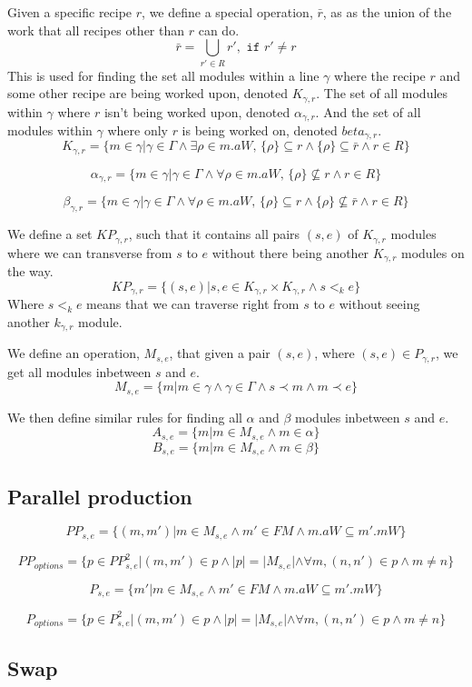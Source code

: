 Given a specific recipe $r$, we define a special operation, $\bar{r}$, as as the union of the work that all recipes other than $r$ can do. 
\[\bar{r} = \bigcup_{r' \in R}r', \texttt{ if } r' \neq r\]
This is used for finding the set all modules within a line $\gamma$ where the recipe $r$ and some other recipe are being worked upon, denoted $K_{\gamma ,r}$. The set of all modules within $\gamma$ where $r$ isn't being worked upon, denoted $\alpha_{\gamma ,r}$. And the set of all modules within $\gamma$ where only $r$ is being worked on, denoted $beta_{\gamma ,r}$. 
\[K_{\gamma ,r} = \{m \in \gamma | \gamma \in \Gamma \land \exists \rho \in m.aW,\, \{\rho\} \subseteq r \land \{\rho\} \subseteq \bar{r} \land r \in R\}\]

\[\alpha_{\gamma ,r}  = \{m \in \gamma | \gamma \in \Gamma \land \forall \rho \in m.aW,\, \{\rho\} \nsubseteq r \land r \in R\}\]

\[\beta_{\gamma ,r}  = \{m \in \gamma | \gamma \in \Gamma \land \forall \rho \in m.aW,\, \{\rho\} \subseteq r \land \{\rho\} \nsubseteq \bar{r} \land r \in R\}\]


We define a set $KP_{\gamma ,r}$, such that it contains all pairs $(s, e)$ of $K_{\gamma ,r}$ modules where we can transverse from $s$ to $e$ without there being another $K_{\gamma, r}$ modules on the way.
\[KP_{\gamma ,r} = \{(s, e)| {s, e} \in K_{\gamma ,r} \times K_{\gamma ,r} \land s <_k  e\}\]
Where $s <_k e$ means that we can traverse right from $s$ to $e$ without seeing another $k_{\gamma, r}$ module. 

We define an operation, $M_{s,e}$, that given a pair $(s, e)$, where $(s, e) \in P_{\gamma ,r}$, we get all modules inbetween $s$ and $e$.
\[M_{s,e} = \{m | m \in \gamma \land \gamma \in \Gamma \land s \prec m \land m \prec e\}\]

We then define similar rules for finding all $\alpha$ and $\beta$ modules inbetween $s$ and $e$.
\[A_{s,e} = \{m |m \in M_{s,e} \land m \in \alpha\}\]
\[B_{s,e} = \{m |m \in M_{s,e} \land m \in \beta\}\]

\subsection{Parallel production}

\[PP_{s, e} = \{(m, m')| m \in M_{s,e} \land m' \in FM \land m.aW \subseteq m'.mW\} \]

\[ PP_{options} = \{p \in {PP}_{s,e}^2 | (m,m') \in p \land |p| = |M_{s,e}| \land  \forall m , (n,n') \in p \land m \neq n \} \]


\[P_{s, e} = \{m'| m \in M_{s,e} \land m' \in FM \land m.aW \subseteq m'.mW\} \]

\[ P_{options} = \{p \in {P}_{s,e}^2 | (m,m') \in p \land |p| = |M_{s,e}| \land  \forall m , (n,n') \in p \land m \neq n \} \]


\subsection{Swap}


